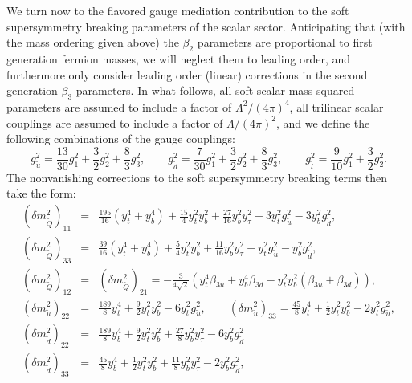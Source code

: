 \documentclass[12pt]{article}
\begin{document}
We turn now to the flavored gauge mediation contribution to the soft supersymmetry breaking parameters of the scalar sector.  Anticipating that (with the mass ordering given above) the $\beta_2$ parameters are proportional to first generation fermion masses, we will neglect them to leading order, and furthermore only consider leading order (linear) corrections in the second generation $\beta_3$ parameters. In what follows, all soft scalar mass-squared parameters are assumed to include a factor of $\Lambda^2/(4\pi)^4$, all trilinear scalar couplings are assumed to include a factor of $\Lambda/(4\pi)^2$, and we define the following combinations of the gauge couplings:  
\begin{equation}
g_{\tilde{u}}^2 =\frac{13}{30} g_1^2+\frac{3}{2}g_2^2+\frac{8}{3}g_3^2, \qquad g_{\tilde{d}}^2 =\frac{7}{30} g_1^2+\frac{3}{2}g_2^2+\frac{8}{3}g_3^2, \qquad g_{\tilde{l}}^2 =\frac{9}{10} g_1^2+\frac{3}{2}g_2^2.
\end{equation}
The nonvanishing corrections to the soft supersymmetry breaking terms then take the form:
\begin{eqnarray}
(\delta m_{\tilde{Q}}^2)_{11}&=&\frac{195}{16}(y_t^4+y_b^4)+\frac{15}{4}y_t^2 y_b^2+\frac{27}{16}y_b^2 y_\tau^2 - 3y_t^2 g_{\tilde{u}}^2-3y_b^2 g_{\tilde{d}}^2, \nonumber \\
(\delta m_{\tilde{Q}}^2)_{33}&=&\frac{39}{16}(y_t^4+y_b^4)+\frac{5}{4}y_t^2 y_b^2+\frac{11}{16}y_b^2 y_\tau^2 - y_t^2 g_{\tilde{u}}^2-y_b^2 g_{\tilde{d}}^2, \nonumber \\
(\delta m_{\tilde{Q}}^2)_{12}&=&(\delta m_{\tilde{Q}}^2)_{21}=-\frac{3}{4\sqrt{2}}(y_t^4\beta_{3u}+y_b^4 \beta_{3d}-y_t^2 y_b^2 (\beta_{3u}+\beta_{3d})), \nonumber \\
(\delta m_{\tilde{u}}^2)_{22}&=&\frac{189}{8}y_t^4+\frac{9}{2}y_t^2 y_b^2 - 6y_t^2 g_{\tilde{u}}^2, \qquad 
(\delta m_{\tilde{u}}^2)_{33}=
\frac{45}{8}y_t^4+\frac{1}{2}y_t^2 y_b^2- 2y_t^2 g_{\tilde{u}}^2, \nonumber \\
(\delta m_{\tilde{d}}^2)_{22}&=&\frac{189}{8}y_b^4+\frac{9}{2}y_t^2 y_b^2+\frac{27}{8}y_b^2y_\tau^2 - 6y_b^2 g_{\tilde{d}}^2 \nonumber \\
(\delta m_{\tilde{d}}^2)_{33}&=&
\frac{45}{8}y_b^4+\frac{1}{2}y_t^2 y_b^2+\frac{11}{8}y_b^2y_\tau^2- 2y_b^2 g_{\tilde{d}}^2,
\end{eqnarray}
\end{document}
